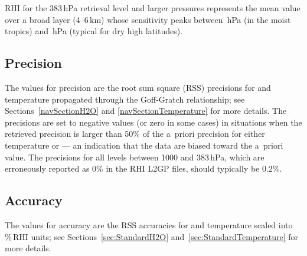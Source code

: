 RHI for the 383\,hPa retrieval level and larger pressures represents the mean value over a broad layer (4--6\,km) whose sensitivity peaks between \,hPa (in the moist tropics) and \,hPa (typical for dry high latitudes).

\subsection{Precision}

The values for precision are the root sum square (RSS) precisions for  and temperature propagated through the Goff-Gratch relationship; see Sections~\ref{navSectionH2O} and \ref{navSectionTemperature} for more details. The precisions are set to negative values (or zero in some cases) in situations when the retrieved precision is larger than 50\% of the a~priori precision for either temperature or  --- an indication that the data are biased toward the a~priori value. The precisions for all levels between 1000 and 383\,hPa, which are erroneously reported as 0\% in the RHI L2GP files, should typically be 0.2\%.

\subsection{Accuracy}

The values for accuracy are the RSS accuracies for  and temperature scaled into \%\,RHI units; see Sections~\ref{sec:StandardH2O} and~\ref{sec:StandardTemperature} for more details.

